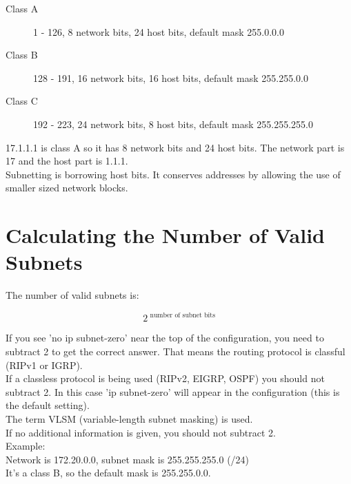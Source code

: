 \documentclass{article}
\begin{document}
\begin{description}
  
\item[Class A]
1 - 126, 8 network bits, 24 host bits, default mask 255.0.0.0
\item[Class B]
128 - 191, 16 network bits, 16 host bits, default mask 255.255.0.0
\item[Class C]
192 - 223, 24 network bits, 8 host bits, default mask 255.255.255.0

\end{description}

17.1.1.1 is class A so it has 8 network bits and 24 host bits. The network
part is 17 and the host part is 1.1.1.\\

Subnetting is borrowing host bits. It conserves addresses by allowing the
use of smaller sized network blocks.

\section{Calculating the Number of Valid Subnets}

The number of valid subnets is:

\begin{equation}
2 ^ {\mbox{ number of subnet bits}}
\end{equation}

If you see 'no ip subnet-zero' near the top of the configuration, you need to
subtract 2 to get the correct answer. That means the routing protocol is
classful (RIPv1 or IGRP).\\

If a classless protocol is being used (RIPv2, EIGRP, OSPF) you should not
subtract 2. In this case 'ip subnet-zero' will appear in the configuration
(this is the default setting).\\

The term VLSM (variable-length subnet masking) is used.\\

If no additional information is given, you should not subtract 2.\\

Example:\\

Network is 172.20.0.0, subnet mask is 255.255.255.0 (/24)\\

It's a class B, so the default mask is 255.255.0.0.
\end{document}
